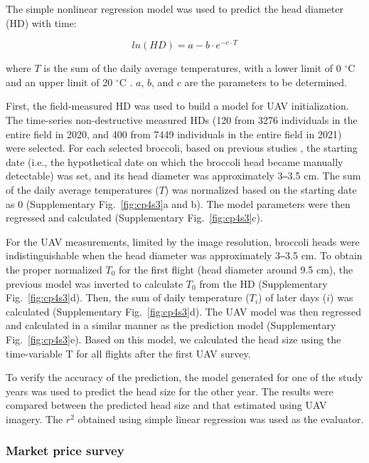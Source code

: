 The simple nonlinear regression model \citep{grevsen_effects_1997} was used to predict the head diameter (HD) with time:

$$ln(HD) = a - b \cdot e ^ {- c \cdot T}$$

\noindent
where $T$ is the sum of the daily average temperatures, with a lower limit of 0 $^\circ$C and an upper limit of 20 $^\circ$C \citep{tan_predicting_2000,cammarano_predicting_2020}. $a$, $b$, and $c$ are the parameters to be determined.

First, the field-measured HD was used to build a model for UAV initialization. The time-series non-destructive measured HDs (120 from 3276 individuals in the entire field in 2020, and 400 from 7449 individuals in the entire field in 2021) were selected. For each selected broccoli, based on previous studies \citep{cammarano_predicting_2020}, the starting date (i.e., the hypothetical date on which the broccoli head became manually detectable) was set, and its head diameter was approximately 3‒3.5 cm. The sum of the daily average temperatures ($T$) was normalized based on the starting date as 0 (Supplementary Fig.~\ref{fig:cp4s3}a and b). The model parameters were then regressed and calculated (Supplementary Fig.~\ref{fig:cp4s3}c). 

For the UAV measurements, limited by the image resolution, broccoli heads were indistinguishable when the head diameter was approximately 3‒3.5 cm. To obtain the proper normalized $T_0$ for the first flight (head diameter around 9.5 cm), the previous model was inverted to calculate $T_0$ from the HD (Supplementary Fig.~\ref{fig:cp4s3}d). Then, the sum of daily temperature ($T_i$) of later days ($i$) was calculated (Supplementary Fig.~\ref{fig:cp4s3}d). The UAV model was then regressed and calculated in a similar manner as the prediction model (Supplementary Fig.~\ref{fig:cp4s3}e). Based on this model, we calculated the head size using the time-variable T for all flights after the first UAV survey.

To verify the accuracy of the prediction, the model generated for one of the study years was used to predict the head size for the other year. The results were compared between the predicted head size and that estimated using UAV imagery. The $r^2$ obtained using simple linear regression was used as the evaluator.

\subsubsection*{Market price survey}

